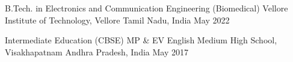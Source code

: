 
\begin{cventries}

\cventry
  {B.Tech. in Electronics and Communication Engineering (Biomedical)}%
  {Vellore Institute of Technology, Vellore}%
  {Tamil Nadu, India}%
  {May 2022}%
  {%
  }

\cventry
  {Intermediate Education (CBSE)}%
  {MP \& EV English Medium High School, Visakhapatnam}%
  {Andhra Pradesh, India}%
  {May 2017}%
  {%
  }

\end{cventries}
